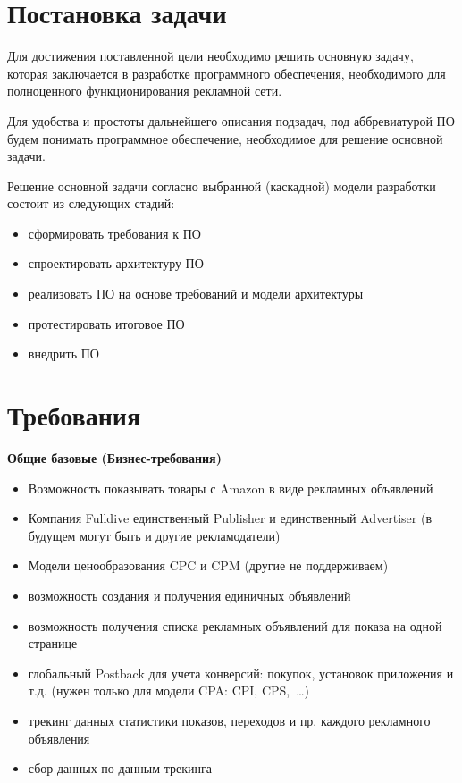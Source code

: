 \documentclass[specification,annotation,times]{itmo-student-thesis}
\begin{document}
\finishrelatedwork %


\section{Постановка задачи}


Для достижения поставленной цели необходимо решить основную задачу, которая заключается в разработке программного обеспечения, необходимого для полноценного функционирования рекламной сети.

Для удобства и простоты дальнейшего описания подзадач, под аббревиатурой ПО будем понимать программное обеспечение, необходимое для решение основной задачи.

Решение основной задачи согласно выбранной (каскадной) модели разработки состоит из следующих стадий:
\begin{itemize}
	\item сформировать требования к ПО
	\item спроектировать архитектуру ПО
	\item реализовать ПО на основе требований и модели архитектуры
	\item протестировать итоговое ПО
	\item внедрить ПО
\end{itemize}
\bigbreak


\section{Требования}\label{sec:requirements}


\textbf{Общие базовые (Бизнес-требования)}
\begin{itemize}
	\item Возможность показывать товары с Amazon в виде рекламных объявлений
	\item Компания Fulldive единственный Publisher и единственный Advertiser (в будущем могут быть и другие рекламодатели)
	\item Модели ценообразования CPC и CPM (другие не поддерживаем)
	\item возможность создания и получения единичных объявлений
	\item возможность получения списка рекламных объявлений для показа на одной странице
	\item глобальный Postback для учета конверсий: покупок, установок приложения и т.д. (нужен только для модели CPA: CPI, CPS, …)
	\item трекинг данных статистики показов, переходов и пр. каждого рекламного объявления
	\item сбор данных по данным трекинга
\end{itemize}
\end{document}
